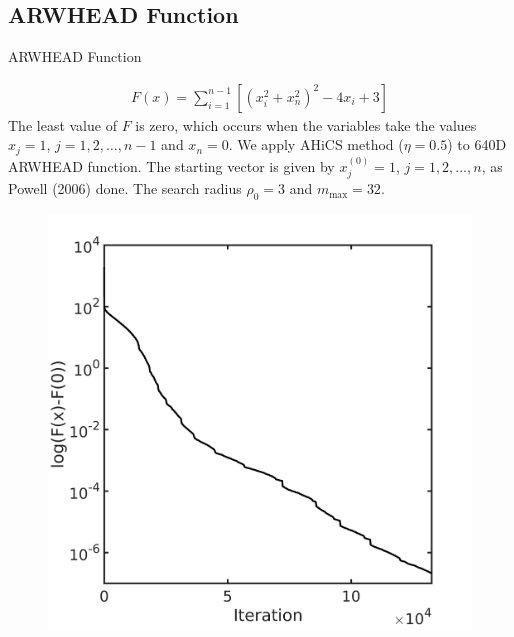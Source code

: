 \documentclass{beamer}
\begin{document}
\subsection{ARWHEAD Function}
\begin{frame}{ARWHEAD Function}

\footnotesize{
\begin{align*}
	F(x) = \sum_{i=1}^{n-1}[(x_i^2+x_n^2)^2 - 4 x_i +3]
\end{align*}
The least value of $F$ is zero, which occurs when the variables take the values
$x_j=1$, $j=1,2,\dots,n-1$ and $x_n=0$. We apply AHiCS method
($\eta=0.5$) to 640D ARWHEAD function.
The starting vector is given by $x_j^{(0)}=1$, $j=1,2,\dots,n$, as
Powell (2006) done. The search radius $\rho_0=3$ and $m_{\max}=32$.
}
%
\begin{figure}[!htbp]
	\centering
	  \includegraphics[scale=0.18]{./figures/arwhead640D.png}

\end{figure}
\end{frame}
\end{document}
